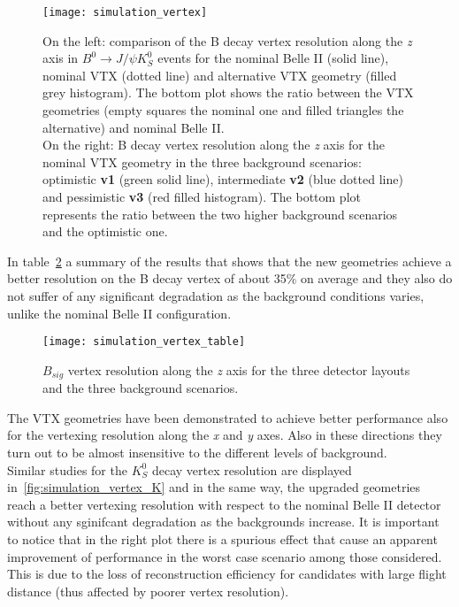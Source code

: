 \begin{figure}[h!]
\centering
\texttt{[image: simulation\_vertex]}
\caption{On the left: comparison of the B decay vertex resolution along the \textit{z} axis in $B^{0} \rightarrow J/\psi K_{S}^{0}$ events for the nominal Belle II (solid line), nominal VTX (dotted line) and alternative VTX geometry (filled grey histogram). The bottom plot shows the ratio between the VTX geometries (empty squares the nominal one and filled triangles the alternative) and nominal Belle II. \\
On the right:  B decay vertex resolution along the \textit{z} axis for the nominal VTX geometry in the three background scenarios: optimistic \textbf{v1} (green solid line), intermediate \textbf{v2} (blue dotted line) and pessimistic \textbf{v3} (red filled histogram). The bottom plot represents the ratio between the two higher background scenarios and the optimistic one.}
\label{fig:simulation_vertex}
\end{figure}

In table~\ref{fig:simulation_vertex_table} a summary of the results that shows that the new geometries achieve a better resolution on the B decay vertex of about 35\% on average and they also do not suffer of any significant degradation as the background conditions varies, unlike the nominal Belle II configuration.


\begin{figure}[h!]
\centering
\texttt{[image: simulation\_vertex\_table]}
\caption{$B_{sig}$ vertex resolution along the \textit{z} axis for the three detector layouts and the three background scenarios.}
\label{fig:simulation_vertex_table}
\end{figure}

The VTX geometries have been demonstrated to achieve better performance also for the vertexing resolution along the \textit{x} and \textit{y} axes. Also in these directions they turn out to be almost insensitive to the different levels of background.\\

Similar studies for the $K_{S}^{0}$ decay vertex resolution are displayed in~\autoref{fig:simulation_vertex_K} and in the same way, the upgraded geometries reach a better vertexing resolution with respect to the nominal Belle II detector without any sginifcant degradation as the backgrounds increase.
It is important to notice that in the right plot there is a spurious effect that cause an apparent improvement of performance in the worst case scenario among those considered. This is due to the loss of reconstruction efficiency for candidates with large flight distance (thus affected by poorer vertex resolution).


